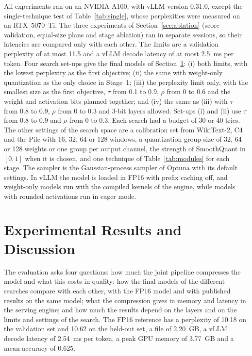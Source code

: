 \documentclass[num-refs]{wiley-article}
\begin{document}
All experiments ran on an NVIDIA A100, with vLLM version 0.31.0, except the single-technique test of Table~\ref{tab:single}, whose perplexities were measured on an RTX~5070~Ti. The three experiments of Section~\ref{sec:ablation} (score validation, equal-size plans and stage ablation) ran in separate sessions, so their latencies are compared only with each other. The limits are a validation perplexity of at most 11.5 and a vLLM decode latency of at most 2.5~ms per token. Four search set-ups give the final models of Section~\ref{sec:results}: (i) both limits, with the lowest perplexity as the first objective; (ii) the same with weight-only quantization as the only choice in Stage~1; (iii) the perplexity limit only, with the smallest size as the first objective, $\tau$ from 0.1 to 0.9, $\rho$ from 0 to 0.6 and the weight and activation bits planned together; and (iv) the same as (iii) with $\tau$ from 0.8 to 0.9, $\rho$ from 0 to 0.3 and 3-bit layers allowed. Set-ups (i) and (ii) use $\tau$ from 0.8 to 0.9 and $\rho$ from 0 to 0.3. Each search had a budget of 30 or 40 tries. The other settings of the search space are a calibration set from WikiText-2, C4 and the Pile with 16, 32, 64 or 128 windows, a quantization group size of 32, 64 or 128 weights or one group per output channel, the strength of SmoothQuant in $[0, 1]$ when it is chosen, and one technique of Table~\ref{tab:modules} for each stage. The sampler is the Gaussian-process sampler of Optuna with its default settings. In vLLM the model is loaded in FP16 with prefix caching off, and weight-only models run with the compiled kernels of the engine, while models with rounded activations run in eager mode.

\section{Experimental Results and Discussion}
\label{sec:results}

The evaluation asks four questions: how much the joint pipeline compresses the model and what this costs in quality; how the final models of the different searches compare with each other, with the FP16 model and with published results on the same model; what the compression gives in memory and latency in the serving engine; and how much the results depend on the layers and on the limits and settings of the search. The FP16 reference has a perplexity of 10.18 on the validation set and 10.62 on the held-out set, a file of 2.20~GB, a vLLM decode latency of 2.54~ms per token, a peak GPU memory of 3.77~GB and a mean accuracy of 0.625.
\end{document}
